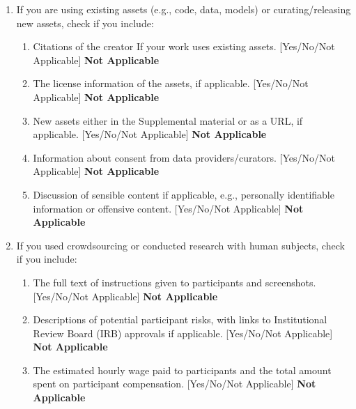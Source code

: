 \documentclass[twoside]{article}
\begin{document}
\begin{enumerate}
\begin{enumerate}
    \end{enumerate}
    \item If you are using existing assets (e.g., code, data, models) or curating/releasing new assets, check if you include:
    \begin{enumerate}
        \item Citations of the creator If your work uses existing assets. [Yes/No/Not Applicable] \textbf{Not Applicable}
        \item The license information of the assets, if applicable. [Yes/No/Not Applicable] \textbf{Not Applicable}
        \item New assets either in the Supplemental material or as a URL, if applicable. [Yes/No/Not Applicable] \textbf{Not Applicable}
        \item Information about consent from data providers/curators. [Yes/No/Not Applicable] \textbf{Not Applicable}
        \item Discussion of sensible content if applicable, e.g., personally identifiable information or offensive content. [Yes/No/Not Applicable] \textbf{Not Applicable}
    \end{enumerate}
    \item If you used crowdsourcing or conducted research with human subjects, check if you include:
    \begin{enumerate}
        \item The full text of instructions given to participants and screenshots. [Yes/No/Not Applicable] \textbf{Not Applicable}
        \item Descriptions of potential participant risks, with links to Institutional Review Board (IRB) approvals if applicable. [Yes/No/Not Applicable] \textbf{Not Applicable}
        \item The estimated hourly wage paid to participants and the total amount spent on participant compensation. [Yes/No/Not Applicable] \textbf{Not Applicable}
    \end{enumerate}
\end{enumerate}









%
%

\appendix
\onecolumn

\setcounter{page}{1}
\renewcommand*{\thepage}{\arabic{page}}
\end{document}
